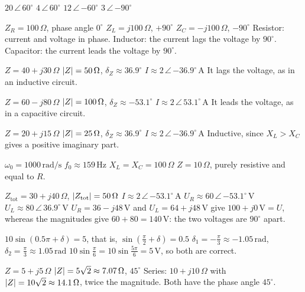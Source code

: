 \begin{facit}
  $20\,\angle\,60^{\circ}$  $4\,\angle\,60^{\circ}$
 $12\,\angle\,{-60^{\circ}}$  $3\,\angle\,{-90^{\circ}}$

  $Z_R = 100\,\Omega$, phase angle $0^{\circ}$
 $Z_L = j100\,\Omega$, $+90^{\circ}$  $Z_C = -j100\,\Omega$, $-90^{\circ}$
 Resistor: current and voltage in phase. Inductor: the current lags the voltage by
$90^{\circ}$. Capacitor: the current leads the voltage by $90^{\circ}$.

  $Z = 40 + j30\,\Omega$  $\lvert Z\rvert = 50\,\Omega$, $\delta_Z \approx
36.9^{\circ}$  $I \approx 2\,\angle\,{-36.9^{\circ}}\,\text{A}$
 It lags the voltage, as in an inductive circuit.

  $Z = 60 - j80\,\Omega$  $\lvert Z\rvert = 100\,\Omega$, $\delta_Z \approx
-53.1^{\circ}$  $I \approx 2\,\angle\,53.1^{\circ}\,\text{A}$
 It leads the voltage, as in a capacitive circuit.

  $Z = 20 + j15\,\Omega$  $\lvert Z\rvert = 25\,\Omega$, $\delta_Z \approx
36.9^{\circ}$  $I \approx 2\,\angle\,{-36.9^{\circ}}\,\text{A}$
 Inductive, since $X_L > X_C$ gives a positive imaginary part.

  $\omega_0 = 1000\,\text{rad/s}$  $f_0 \approx 159\,\text{Hz}$
 $X_L = X_C = 100\,\Omega$
 $Z = 10\,\Omega$, purely resistive and equal to $R$.

  $Z_{\text{tot}} = 30 + j40\,\Omega$, $\lvert Z_{\text{tot}}\rvert = 50\,\Omega$
 $I \approx 2\,\angle\,{-53.1^{\circ}}\,\text{A}$
 $U_R \approx 60\,\angle\,{-53.1^{\circ}}\,\text{V}$
 $U_L \approx 80\,\angle\,36.9^{\circ}\,\text{V}$
 $U_R = 36 - j48\,\text{V}$ and $U_L = 64 + j48\,\text{V}$ give $100 + j0\,\text{V} = U$,
whereas the magnitudes give $60 + 80 = 140\,\text{V}$: the two voltages are $90^{\circ}$ apart.

  $10\sin(0.5\pi + \delta) = 5$, that is, $\sin\left(\frac{\pi}{2} +
\delta\right) = 0.5$
 $\delta_1 = -\frac{\pi}{3} \approx -1.05\,\text{rad}$, $\delta_2 = \frac{\pi}{3} \approx
1.05\,\text{rad}$
 $10\sin\frac{\pi}{6} = 10\sin\frac{5\pi}{6} = 5\,\text{V}$, so both are correct.

  $Z = 5 + j5\,\Omega$
 $\lvert Z\rvert = 5\sqrt{2} \approx 7.07\,\Omega$, $45^{\circ}$
 Series: $10 + j10\,\Omega$ with $\lvert Z\rvert = 10\sqrt{2} \approx 14.1\,\Omega$, twice the
magnitude.
 Both have the phase angle $45^{\circ}$.


\end{facit}
